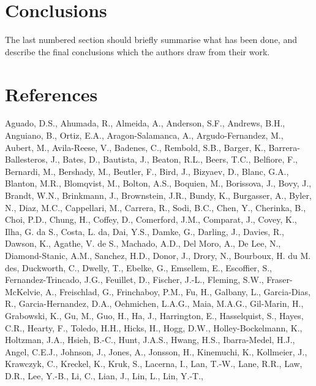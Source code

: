 \documentclass[]{elsarticle} %
\newlength{\cslhangindent}
\newlength{\cslentryspacingunit} %
\newenvironment{CSLReferences}[2] %
 {%
  \setlength{\parindent}{0pt}
  \ifodd #1
  \let\oldpar\par
  \def\par{\hangindent=\cslhangindent\oldpar}
  \fi
  \setlength{\parskip}{#2\cslentryspacingunit}
 }%
 {}
\begin{document}
\hypertarget{conclusions}{%
\section{Conclusions}\label{conclusions}}

The last numbered section should briefly summarise what has been done,
and describe the final conclusions which the authors draw from their
work.

\hypertarget{references}{%
\section*{References}\label{references}}

\hypertarget{refs}{}
\begin{CSLReferences}{1}{0}
\leavevmode{}%
Aguado, D.S., Ahumada, R., Almeida, A., Anderson, S.F., Andrews, B.H.,
Anguiano, B., Ortiz, E.A., Aragon-Salamanca, A., Argudo-Fernandez, M.,
Aubert, M., Avila-Reese, V., Badenes, C., Rembold, S.B., Barger, K.,
Barrera-Ballesteros, J., Bates, D., Bautista, J., Beaton, R.L., Beers,
T.C., Belfiore, F., Bernardi, M., Bershady, M., Beutler, F., Bird, J.,
Bizyaev, D., Blanc, G.A., Blanton, M.R., Blomqvist, M., Bolton, A.S.,
Boquien, M., Borissova, J., Bovy, J., Brandt, W.N., Brinkmann, J.,
Brownstein, J.R., Bundy, K., Burgasser, A., Byler, N., Diaz, M.C.,
Cappellari, M., Carrera, R., Sodi, B.C., Chen, Y., Cherinka, B., Choi,
P.D., Chung, H., Coffey, D., Comerford, J.M., Comparat, J., Covey, K.,
Ilha, G. da S., Costa, L. da, Dai, Y.S., Damke, G., Darling, J., Davies,
R., Dawson, K., Agathe, V. de S., Machado, A.D., Del Moro, A., De Lee,
N., Diamond-Stanic, A.M., Sanchez, H.D., Donor, J., Drory, N., Bourboux,
H. du M. des, Duckworth, C., Dwelly, T., Ebelke, G., Emsellem, E.,
Escoffier, S., Fernandez-Trincado, J.G., Feuillet, D., Fischer, J.-L.,
Fleming, S.W., Fraser-McKelvie, A., Freischlad, G., Frinchaboy, P.M.,
Fu, H., Galbany, L., Garcia-Dias, R., Garcia-Hernandez, D.A., Oehmichen,
L.A.G., Maia, M.A.G., Gil-Marin, H., Grabowski, K., Gu, M., Guo, H., Ha,
J., Harrington, E., Hasselquist, S., Hayes, C.R., Hearty, F., Toledo,
H.H., Hicks, H., Hogg, D.W., Holley-Bockelmann, K., Holtzman, J.A.,
Hsieh, B.-C., Hunt, J.A.S., Hwang, H.S., Ibarra-Medel, H.J., Angel,
C.E.J., Johnson, J., Jones, A., Jonsson, H., Kinemuchi, K., Kollmeier,
J., Krawczyk, C., Kreckel, K., Kruk, S., Lacerna, I., Lan, T.-W., Lane,
R.R., Law, D.R., Lee, Y.-B., Li, C., Lian, J., Lin, L., Lin, Y.-T.,

\end{CSLReferences}
\end{document}
